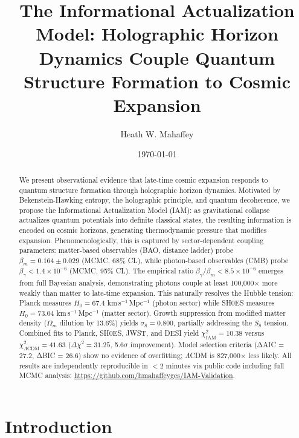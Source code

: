 \documentclass[twocolumn,superscriptaddress,prl,amsmath,amssymb]{revtex4-2}
\begin{document}
\title{The Informational Actualization Model: Holographic Horizon Dynamics Couple Quantum Structure Formation to Cosmic Expansion}

\author{Heath W. Mahaffey}

\date{\today}

\begin{abstract}
We present observational evidence that late-time cosmic expansion responds to quantum structure formation through holographic horizon dynamics. Motivated by Bekenstein-Hawking entropy, the holographic principle, and quantum decoherence, we propose the Informational Actualization Model (IAM): as gravitational collapse actualizes quantum potentials into definite classical states, the resulting information is encoded on cosmic horizons, generating thermodynamic pressure that modifies expansion. Phenomenologically, this is captured by sector-dependent coupling parameters: matter-based observables (BAO, distance ladder) probe $\beta_m = 0.164 \pm 0.029$ (MCMC, 68\% CL), while photon-based observables (CMB) probe $\beta_\gamma < 1.4 \times 10^{-6}$ (MCMC, 95\% CL). The empirical ratio $\beta_\gamma/\beta_m < 8.5 \times 10^{-6}$ emerges from full Bayesian analysis, demonstrating photons couple at least 100,000$\times$ more weakly than matter to late-time expansion. This naturally resolves the Hubble tension: Planck measures $H_0 = 67.4$ km\,s$^{-1}$\,Mpc$^{-1}$ (photon sector) while SH0ES measures $H_0 = 73.04$ km\,s$^{-1}$\,Mpc$^{-1}$ (matter sector). Growth suppression from modified matter density ($\Omega_m$ dilution by 13.6\%) yields $\sigma_8 = 0.800$, partially addressing the $S_8$ tension. Combined fits to Planck, SH0ES, JWST, and DESI yield $\chi^2_{\text{IAM}} = 10.38$ versus $\chi^2_{\Lambda\text{CDM}} = 41.63$ ($\Delta\chi^2 = 31.25$, 5.6$\sigma$ improvement). Model selection criteria (ΔAIC = 27.2, ΔBIC = 26.6) show no evidence of overfitting; $\Lambda$CDM is 827,000$\times$ less likely. All results are independently reproducible in $<$2 minutes via public code including full MCMC analysis: \url{https://github.com/hmahaffeyges/IAM-Validation}.
\end{abstract}

\maketitle

\section{Introduction}
\end{document}
